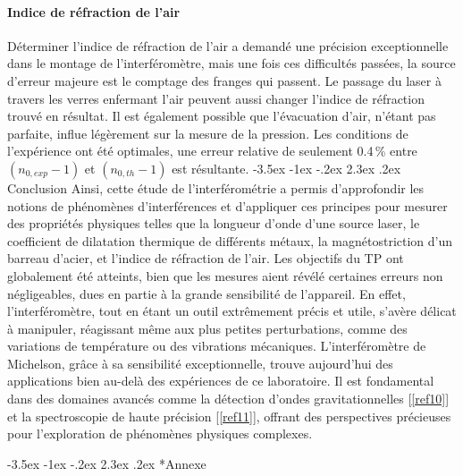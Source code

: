 \documentclass[a4paper, 12pt,oneside]{article}
\makeatletter
\renewcommand{\section}{\@startsection {section}{1}{\z@}%
             {-3.5ex \@plus -1ex \@minus -.2ex}%
             {2.3ex \@plus.2ex}%
             {\normalfont\normalsize\bfseries}}
\makeatother
\begin{document}
\paragraph{Indice de réfraction de l'air}

Déterminer l'indice de réfraction de l'air a demandé une précision exceptionnelle dans le montage de l'interféromètre, mais une fois ces difficultés passées, la source d'erreur majeure est le comptage des franges qui passent. Le passage du laser à travers les verres enfermant l'air peuvent aussi changer l'indice de réfraction trouvé en résultat. Il est également possible que l'évacuation d'air, n'étant pas parfaite, influe légèrement sur la mesure de la pression. Les conditions de l'expérience ont été optimales, une erreur relative de seulement 0.4\,\% entre $(n_{0,exp} - 1)$ et $(n_{0,th} - 1)$ est résultante.
\vspace{-0.3cm}
\section{Conclusion}
\vspace{-0.3cm}
Ainsi, cette étude de l'interférométrie a permis d'approfondir les notions de phénomènes d'interférences et d’appliquer ces principes pour mesurer des propriétés physiques telles que la longueur d’onde d’une source laser, le coefficient de dilatation thermique de différents métaux, la magnétostriction d’un barreau d’acier, et l'indice de réfraction de l’air. Les objectifs du TP ont globalement été atteints, bien que les mesures aient révélé certaines erreurs non négligeables, dues en partie à la grande sensibilité de l'appareil. En effet, l’interféromètre, tout en étant un outil extrêmement précis et utile, s'avère délicat à manipuler, réagissant même aux plus petites perturbations, comme des variations de température ou des vibrations mécaniques. L'interféromètre de Michelson, grâce à sa sensibilité exceptionnelle, trouve aujourd'hui des applications bien au-delà des expériences de ce laboratoire. Il est fondamental dans des domaines avancés comme la détection d'ondes gravitationnelles [\ref{ref10}] et la spectroscopie de haute précision [\ref{ref11}], offrant des perspectives précieuses pour l’exploration de phénomènes physiques complexes.


\section*{Annexe}
\end{document}
